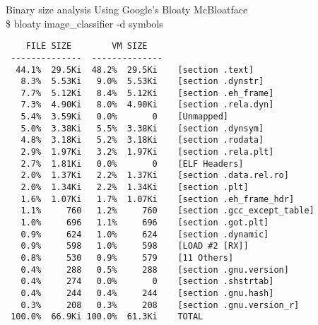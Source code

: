 \begin{frame}[fragile]{Binary size analysis}
Using Google's Bloaty McBloatface \\
\ttfamily \$ bloaty image\_classifier -d symbols
  \lstset{basicstyle=\tiny, numbers=left}
  \begin{lstlisting}
    FILE SIZE        VM SIZE
 --------------  --------------
  44.1%  29.5Ki  48.2%  29.5Ki    [section .text]
   8.3%  5.53Ki   9.0%  5.53Ki    [section .dynstr]
   7.7%  5.12Ki   8.4%  5.12Ki    [section .eh_frame]
   7.3%  4.90Ki   8.0%  4.90Ki    [section .rela.dyn]
   5.4%  3.59Ki   0.0%       0    [Unmapped]
   5.0%  3.38Ki   5.5%  3.38Ki    [section .dynsym]
   4.8%  3.18Ki   5.2%  3.18Ki    [section .rodata]
   2.9%  1.97Ki   3.2%  1.97Ki    [section .rela.plt]
   2.7%  1.81Ki   0.0%       0    [ELF Headers]
   2.0%  1.37Ki   2.2%  1.37Ki    [section .data.rel.ro]
   2.0%  1.34Ki   2.2%  1.34Ki    [section .plt]
   1.6%  1.07Ki   1.7%  1.07Ki    [section .eh_frame_hdr]
   1.1%     760   1.2%     760    [section .gcc_except_table]
   1.0%     696   1.1%     696    [section .got.plt]
   0.9%     624   1.0%     624    [section .dynamic]
   0.9%     598   1.0%     598    [LOAD #2 [RX]]
   0.8%     530   0.9%     579    [11 Others]
   0.4%     288   0.5%     288    [section .gnu.version]
   0.4%     274   0.0%       0    [section .shstrtab]
   0.4%     244   0.4%     244    [section .gnu.hash]
   0.3%     208   0.3%     208    [section .gnu.version_r]
 100.0%  66.9Ki 100.0%  61.3Ki    TOTAL
  \end{lstlisting}
\end{frame}

